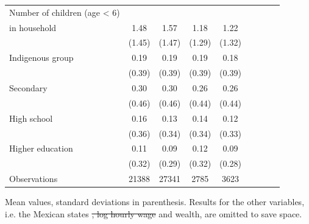 \documentclass[12pt,english]{article}
\providecommand{\DIFaddtex}[1]{{\protect\color{blue}\uwave{#1}}} %
\providecommand{\DIFdeltex}[1]{{\protect\color{red}\sout{#1}}}                      %
\providecommand{\DIFaddFL}[1]{\DIFadd{#1}} %
\providecommand{\DIFdelFL}[1]{\DIFdel{#1}} %
\providecommand{\DIFaddbeginFL}{} %
\providecommand{\DIFaddendFL}{} %
\providecommand{\DIFdelbeginFL}{} %
\providecommand{\DIFdelendFL}{} %
\providecommand{\DIFadd}[1]{\texorpdfstring{\DIFaddtex{#1}}{#1}} %
\providecommand{\DIFdel}[1]{\texorpdfstring{\DIFdeltex{#1}}{}} %
\begin{document}
\begin{table}[p]
\begin{adjustbox}{max width=\linewidth, center}
\begin{threeparttable}
{\begin{tabular}{l*{4}{SS}}
Number of children (age < 6) \DIFaddbeginFL &&&&\\
\DIFaddendFL in household&        1.48&        1.57&        1.18&        1.22\\
                    &      (1.45)&      (1.47)&      (1.29)&      (1.32)\\
Indigenous group    &        0.19&        0.19&        0.19&        0.18\\
                    &      (0.39)&      (0.39)&      (0.39)&      (0.39)\\
Secondary           &        0.30&        0.30&        0.26&        0.26\\
                    &      (0.46)&      (0.46)&      (0.44)&      (0.44)\\
High school         &        0.16&        0.13&        0.14&        0.12\\
                    &      (0.36)&      (0.34)&      (0.34)&      (0.33)\\
Higher education    &        0.11&        0.09&        0.12&        0.09\\
                    &      (0.32)&      (0.29)&      (0.32)&      (0.28)\\
\midrule
Observations        &    21388&       27341&        2785&        3623\\
\bottomrule
\end{tabular}
\begin{tablenotes}
\item \DIFaddbeginFL \footnotesize \textit{\DIFaddFL{Notes}} \DIFaddendFL Mean values, standard deviations in parenthesis. Results for the other variables, i.e. the Mexican states \DIFdelbeginFL \DIFdelFL{, log hourly wage }\DIFdelendFL and wealth, are omitted to save space.
\end{tablenotes}
}
\end{threeparttable}
\end{adjustbox}
\end{table}
\end{document}
